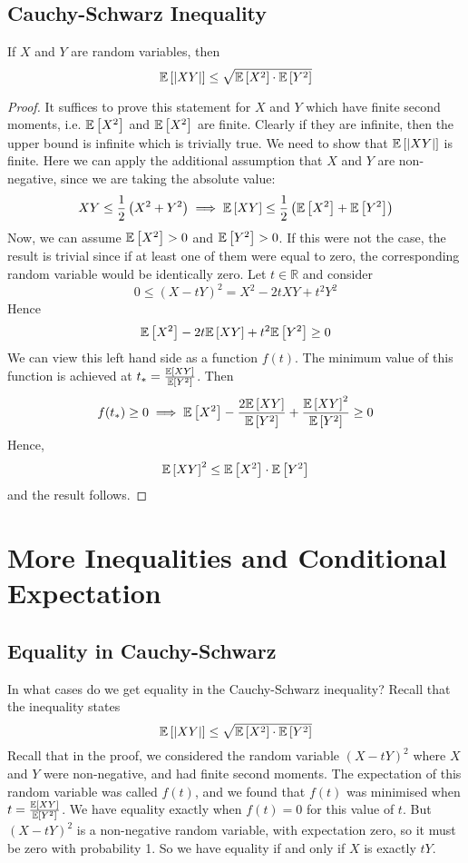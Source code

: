 \documentclass{article}
\begin{document}
\subsection{Cauchy-Schwarz Inequality}
\begin{theorem}
    If $X$ and $Y$ are random variables, then
    \[ \mathbb{E}\left[{\abs{XY}}\right] \leq \sqrt{\mathbb{E}\left[{X^2}\right]\cdot\mathbb{E}\left[{Y^2}\right]} \]
\end{theorem}
\begin{proof}
    It suffices to prove this statement for $X$ and $Y$ which have finite second moments, i.e. $\mathbb{E}\left[{X^2}\right]$ and $\mathbb{E}\left[{X^2}\right]$ are finite. Clearly if they are infinite, then the upper bound is infinite which is trivially true. We need to show that $\mathbb{E}\left[{\abs{XY}}\right]$ is finite. Here we can apply the additional assumption that $X$ and $Y$ are non-negative, since we are taking the absolute value:
    \[ XY \leq \frac{1}{2}\left(X^2 + Y^2\right) \implies \mathbb{E}\left[{XY}\right] \leq \frac{1}{2}\left( \mathbb{E}\left[{X^2}\right] + \mathbb{E}\left[{Y^2}\right]  \right) \]
    Now, we can assume $\mathbb{E}\left[{X^2}\right] > 0$ and $\mathbb{E}\left[{Y^2}\right] > 0$. If this were not the case, the result is trivial since if at least one of them were equal to zero, the corresponding random variable would be identically zero. Let $t \in \mathbb R$ and consider
    \[ 0 \leq (X - tY)^2 = X^2 - 2tXY + t^2Y^2 \]
    Hence
    \[ \mathbb{E}\left[{X^2}\right] - 2t\mathbb{E}\left[{XY}\right] + t^2\mathbb{E}\left[{Y^2}\right] \geq 0 \]
    We can view this left hand side as a function $f(t)$. The minimum value of this function is achieved at $t_\ast = \frac{\mathbb{E}\left[{XY}\right]}{\mathbb{E}\left[{Y^2}\right]}$. Then
    \[ f(t_\ast) \geq 0 \implies \mathbb{E}\left[{X^2}\right] - \frac{2\mathbb{E}\left[{XY}\right]}{\mathbb{E}\left[{Y^2}\right]} + \frac{\mathbb{E}\left[{XY}\right]^2}{\mathbb{E}\left[{Y^2}\right]} \geq 0 \]
    Hence,
    \[ \mathbb{E}\left[{XY}\right]^2 \leq \mathbb{E}\left[{X^2}\right]\cdot \mathbb{E}\left[{Y^2}\right] \]
    and the result follows.
\end{proof}

\section{More Inequalities and Conditional Expectation}
\subsection{Equality in Cauchy-Schwarz}
In what cases do we get equality in the Cauchy-Schwarz inequality? Recall that the inequality states
\[ \mathbb{E}\left[{\abs{XY}}\right] \leq \sqrt{\mathbb{E}\left[{X^2}\right]\cdot\mathbb{E}\left[{Y^2}\right]} \]
Recall that in the proof, we considered the random variable $(X - tY)^2$ where $X$ and $Y$ were non-negative, and had finite second moments. The expectation of this random variable was called $f(t)$, and we found that $f(t)$ was minimised when $t = \frac{\mathbb{E}\left[{XY}\right]}{\mathbb{E}\left[{Y^2}\right]}$. We have equality exactly when $f(t) = 0$ for this value of $t$. But $(X - tY)^2$ is a non-negative random variable, with expectation zero, so it must be zero with probability 1. So we have equality if and only if $X$ is exactly $tY$.
\end{document}
